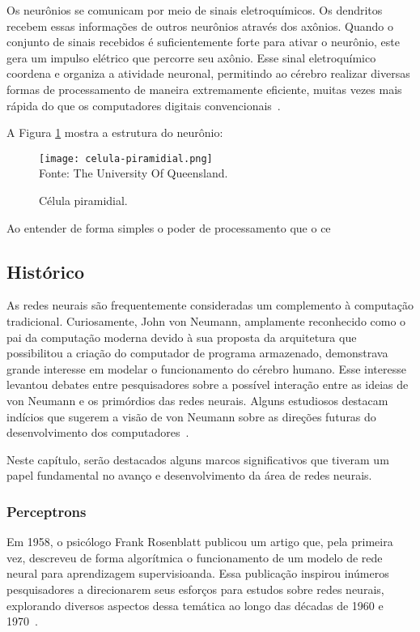     Os neurônios se comunicam por meio de sinais eletroquímicos. Os dendritos recebem essas informações de outros 
    neurônios através dos axônios. Quando o conjunto de sinais recebidos é suficientemente forte para ativar o 
    neurônio, este gera um impulso elétrico que percorre seu axônio. Esse sinal eletroquímico coordena e organiza a 
    atividade neuronal, permitindo ao cérebro realizar diversas formas de processamento de maneira extremamente 
    eficiente, muitas vezes mais rápida do que os computadores digitais convencionais~\cite{haykin2009neural}.

    A Figura \ref{fig:celula_piramidial} mostra a estrutura do neurônio:
    \begin{figure}[!htb]
        \centering
        \caption{Célula piramidial.}
        \texttt{[image: celula-piramidial.png]}\\
        {\footnotesize Fonte: The University Of Queensland.}\
        \label{fig:celula_piramidial}
    \end{figure}
    
    Ao entender de forma simples o poder de processamento que o ce
    \subsection{Histórico}
        As redes neurais são frequentemente consideradas um complemento à computação tradicional. Curiosamente, 
        John von Neumann, amplamente reconhecido como o pai da computação moderna devido à sua proposta da arquitetura 
        que possibilitou a criação do computador de programa armazenado, demonstrava grande interesse em modelar o 
        funcionamento do cérebro humano. Esse interesse levantou debates entre pesquisadores sobre a possível interação 
        entre as ideias de von Neumann e os primórdios das redes neurais. Alguns estudiosos destacam indícios que 
        sugerem a visão de von Neumann sobre as direções futuras do desenvolvimento dos computadores~\cite{Fausett1994}.

        Neste capítulo, serão destacados alguns marcos significativos que tiveram um papel fundamental no avanço e
        desenvolvimento da área de redes neurais.

        \subsubsection{Perceptrons}
            
            Em 1958, o psicólogo Frank Rosenblatt publicou um artigo que, pela primeira vez, descreveu de forma 
            algorítmica o funcionamento de um modelo de rede neural para aprendizagem supervisioanda. Essa 
            publicação inspirou inúmeros pesquisadores a direcionarem seus esforços para estudos sobre redes neurais, 
            explorando diversos aspectos dessa temática ao longo das décadas de 1960 e 1970~\cite{haykin2009neural}.

